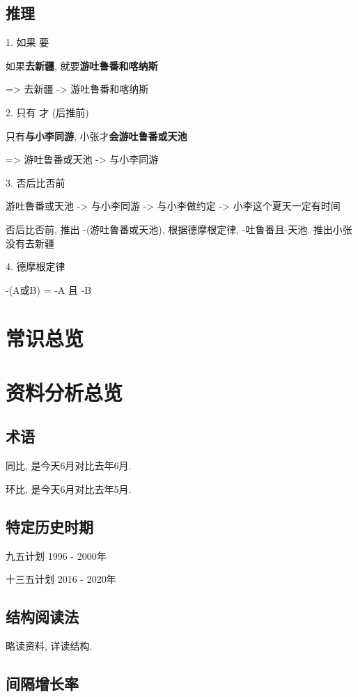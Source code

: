 \documentclass[UTF8]{ctexart}
\begin{document}
\subsection{推理}

1. 如果    要

如果\textbf{去新疆}, 就要\textbf{游吐鲁番和喀纳斯}

=> 去新疆 -> 游吐鲁番和喀纳斯

2. 只有   才 (后推前)

只有\textbf{与小李同游}, 小张才\textbf{会游吐鲁番或天池}

=> 游吐鲁番或天池 -> 与小李同游

3. 否后比否前


游吐鲁番或天池 -> 与小李同游 -> 与小李做约定 -> 小李这个夏天一定有时间

否后比否前, 推出 -(游吐鲁番或天池), 根据德摩根定律, -吐鲁番且-天池. 推出小张没有去新疆

4. 德摩根定律

-(A或B) = -A 且 -B

\section{常识总览}


\section{资料分析总览}

\subsection{术语}
同比, 是今天6月对比去年6月.

环比, 是今天6月对比去年5月.

\subsection{特定历史时期}

九五计划 1996 - 2000年

十三五计划 2016 - 2020年

\subsection{结构阅读法}

略读资料, 详读结构.

\subsection{间隔增长率}
\end{document}
